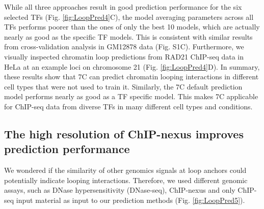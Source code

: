 \documentclass[a4paper,twoside=true,openright,parskip=full,chapterprefix=true,11pt,headings=normal,bibliography=totoc,listof=totoc,titlepage=on,captions=tableabove,draft=false]{scrreprt}
\theoremstyle{definition}
\theoremstyle{definition}
\theoremstyle{definition}
\theoremstyle{remark}
\begin{document}
While all three approaches result in good prediction performance for the
six selected TFs (Fig. \ref{fig:LoopPred4}C), the model averaging
parameters across all TFs performs poorer than the ones of only the best
10 models, which are actually nearly as good as the specific TF models.
This is consistent with similar results from cross-validation analysis
in GM12878 data (Fig. S1C). Furthermore, we visually inspected chromatin
loop predictions from RAD21 ChIP-seq data in HeLa at an example loci on
chromosome 21 (Fig. \ref{fig:LoopPred4}D). In summary, these results
show that 7C can predict chromatin looping interactions in different
cell types that were not used to train it. Similarly, the 7C default
prediction model performs nearly as good as a TF specific model. This
makes 7C applicable for ChIP-seq data from diverse TFs in many different
cell types and conditions.

\hypertarget{the-high-resolution-of-chip-nexus-improves-prediction-performance}{%
\subsection{The high resolution of ChIP-nexus improves prediction
performance}\label{the-high-resolution-of-chip-nexus-improves-prediction-performance}}

We wondered if the similarity of other genomics signals at loop anchors
could potentially indicate looping interactions. Therefore, we used
different genomic assays, such as DNase hypersensitivity (DNase-seq),
ChIP-nexus and only ChIP-seq input material as input to our prediction
methods (Fig. \ref{fig:LoopPred5}).
\end{document}
